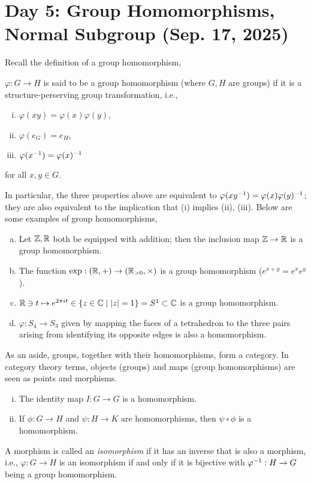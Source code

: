 \section{Day 5: Group Homomorphisms, Normal Subgroup (Sep. 17, 2025)}
Recall the definition of a group homomorphism,
\begin{definition}
    $\varphi : G \to H$ is said to be a group homomorphism (where $G, H$ are groups) if it is a structure-perserving group transformation, i.e.,
    \begin{enumerate}[(i)]
        \item $\varphi(xy) = \varphi(x) \varphi(y)$,
        \item $\varphi(e_G) = e_H$,
        \item $\varphi(x ^{-1}) = \varphi(x) ^{-1}$
    \end{enumerate}
    for all $x, y \in G$.
\end{definition}
\noindent In particular, the three properties above are equivalent to $\varphi(xy ^{-1}) = \varphi(x) \varphi(y) ^{-1}$; they are also equivalent to the implication that (i) implies (ii), (iii). Below are some examples of group homomorphisms,
\begin{enumerate}[(a)]
    \item Let $\mathbb Z, \mathbb R$ both be equipped with addition; then the inclusion map $\mathbb Z \to \mathbb R$ is a group homomorphism.
    \item The function $\exp : (\mathbb R, +) \to (\mathbb R_{>0}, \times)$ is a group homomorphism ($e^{x+y} = e^x e^y$).
    \item $\mathbb R \ni t \mapsto e^{2\pi i t} \in \{z \in \mathbb C \mid \left\lvert z \right\rvert = 1\} = S^1 \subset \mathbb C$ is a group homomorphism.
    \item $\varphi : S_4 \to S_3$ given by mapping the faces of a tetrahedron to the three pairs arising from identifying its opposite edges is also a homomorphism. 
\end{enumerate}
\noindent As an aside, groups, together with their homomorphisms, form a category. In category theory terms, objects (groups) and maps (group homomorphisms) are seen as points and morphisms.
\begin{enumerate}[(i)]
    \item The identity map $I : G \to G$ is a homomorphism.
    \item If $\phi : G \to H$ and $\psi : H \to K$ are homomorphisms, then $\psi \circ \phi$ is a homomorphism.
\end{enumerate}
A morphism is called an \textit{isomorphism} if it has an inverse that is also a morphism, i.e., $\varphi : G \to H$ is an isomorphism if and only if it is bijective with $\varphi ^{-1} : H \to G$ being a group homomorphism.
